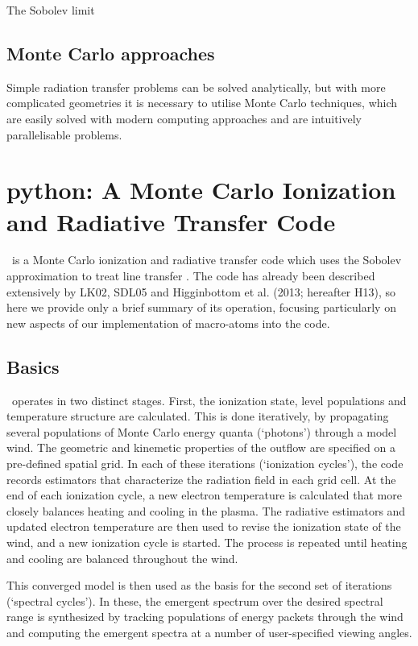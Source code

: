 The Sobolev limit 



\subsection{Monte Carlo approaches}

Simple radiation transfer problems can be solved analytically,
but with more complicated geometries it is necessary to utilise Monte Carlo
techniques, which are easily solved with modern computing approaches and 
are intuitively parallelisable problems.


\section{{\sc python}: A Monte Carlo Ionization and Radiative Transfer Code}

\py\ is a Monte Carlo  ionization and radiative transfer code which
uses the Sobolev approximation to treat line transfer 
\citep[e.g.][]{sobolev1957,sobolev1960,rybickihummer1978}. 
The code has already been described extensively by LK02, SDL05 and 
Higginbottom et al. (2013; hereafter H13), so here we provide only a brief summary of its operation, 
focusing particularly on new aspects of our implementation of macro-atoms into the code.

\subsection{Basics}

\py\ operates in two distinct stages. First, the ionization state,
level populations and temperature structure are calculated. This is
done iteratively, by propagating several populations of Monte Carlo energy quanta (`photons')
through a model wind. The geometric and kinemetic properties of the
outflow are specified on a pre-defined spatial grid. In each of these
iterations (`ionization cycles'), the code records estimators that 
characterize the radiation field in each grid cell. At the end 
of each ionization cycle, a new electron temperature is calculated
that more closely balances heating and cooling in the 
plasma. The radiative estimators and updated electron
temperature are then used to revise the ionization state of the wind,
and a new ionization cycle is started. The process is repeated until
heating and cooling are balanced throughout the wind. 

This converged model is then used as the basis for the second set of
iterations (`spectral cycles'). In these, the emergent spectrum over
the desired spectral range is synthesized by tracking populations of
energy packets through the wind and computing the emergent spectra at
a number of user-specified viewing angles.  

